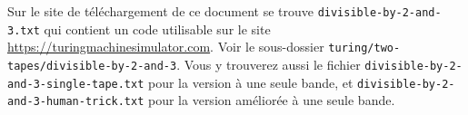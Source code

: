 Sur le site de téléchargement de ce document se trouve \verb+divisible-by-2-and-3.txt+ qui contient un code utilisable sur le site \url{https://turingmachinesimulator.com}. Voir le sous-dossier \verb+turing/two-tapes/divisible-by-2-and-3+.
Vous y trouverez aussi le fichier \verb+divisible-by-2-and-3-single-tape.txt+ pour la version à une seule bande,
et \verb+divisible-by-2-and-3-human-trick.txt+ pour la version améliorée à une seule bande.